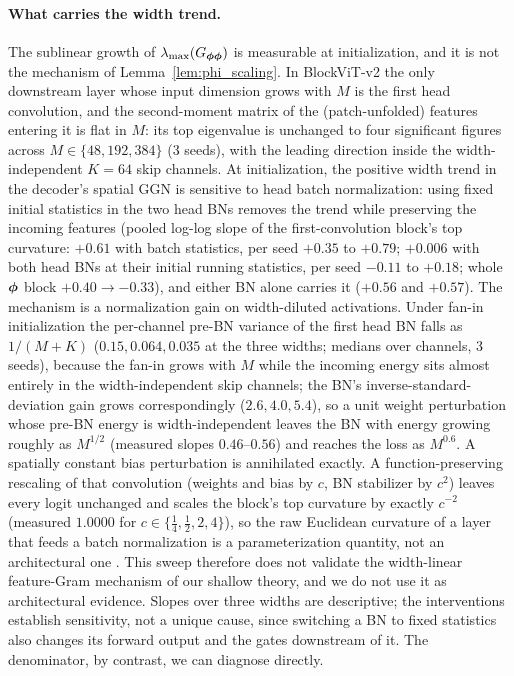 \paragraph{What carries the width trend.}
The sublinear growth of $\lambda_{\max}(G_{{\boldsymbol{\phi}}{\boldsymbol{\phi}}})$ is measurable at
initialization, and it is not the mechanism of
Lemma~\ref{lem:phi_scaling}. In BlockViT-v2 the only downstream layer
whose input dimension grows with $M$ is the first head convolution, and
the second-moment matrix of the (patch-unfolded) features entering it is
flat in $M$: its top eigenvalue is unchanged to four significant figures
across $M \in \{48, 192, 384\}$ (3 seeds), with the leading direction
inside the width-independent $K{=}64$ skip channels. At initialization,
the positive width trend in the decoder's spatial GGN is sensitive to head
batch normalization: using fixed initial statistics in the two head BNs
removes the trend while preserving the incoming features (pooled log-log
slope of the first-convolution block's top curvature: $+0.61$ with batch
statistics, per seed $+0.35$ to $+0.79$; $+0.006$ with both head BNs at
their initial running statistics, per seed $-0.11$ to $+0.18$; whole
${\boldsymbol{\phi}}$ block $+0.40 \to -0.33$), and either BN alone carries it ($+0.56$
and $+0.57$). The mechanism is a normalization gain on width-diluted
activations. Under fan-in initialization the per-channel pre-BN variance
of the first head BN falls as $1/(M{+}K)$ ($0.15, 0.064, 0.035$ at the
three widths; medians over channels, 3 seeds), because the fan-in grows
with $M$ while the incoming energy sits almost entirely in the
width-independent skip channels; the BN's inverse-standard-deviation gain
grows correspondingly ($2.6, 4.0, 5.4$), so a unit weight perturbation
whose pre-BN energy is width-independent leaves the BN with energy growing
roughly as $M^{1/2}$ (measured slopes $0.46$--$0.56$) and reaches the loss
as $M^{0.6}$. A spatially constant bias perturbation is annihilated
exactly. A function-preserving rescaling of that convolution (weights and
bias by $c$, BN stabilizer by $c^2$) leaves every logit unchanged and
scales the block's top curvature by exactly $c^{-2}$ (measured $1.0000$
for $c \in \{\tfrac14, \tfrac12, 2, 4\}$), so the raw Euclidean curvature
of a layer that feeds a batch normalization is a parameterization
quantity, not an architectural one \citep{vanlaarhoven2017l2}. This sweep
therefore does not validate the width-linear feature-Gram mechanism of our
shallow theory, and we do not use it as architectural evidence. Slopes
over three widths are descriptive; the interventions establish
sensitivity, not a unique cause, since switching a BN to fixed statistics
also changes its forward output and the gates downstream of it. The
denominator, by contrast, we can diagnose directly.

